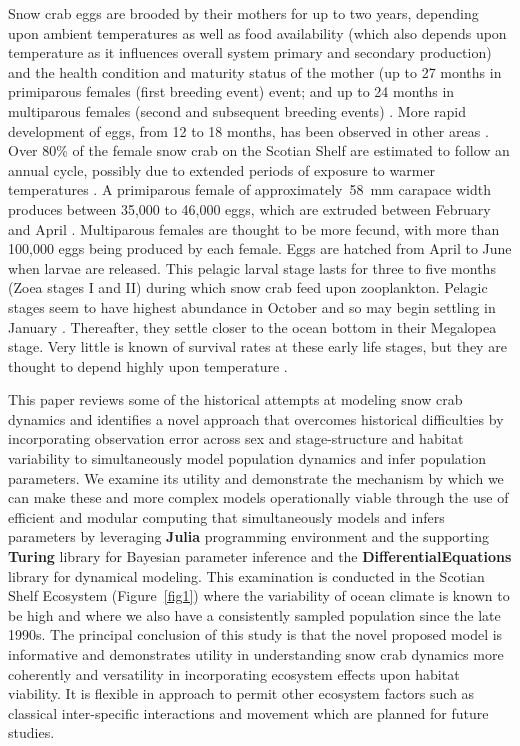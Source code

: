 \documentclass[
	letterpaper, %
	10pt, %
]{article}
\begin{document}
Snow crab eggs are brooded by their mothers for up to two years,
depending upon ambient temperatures as well as food availability (which
also depends upon temperature as it influences overall system primary
and secondary production) and the health condition and maturity status
of the mother (up to 27 months in primiparous females (first breeding event)
event; and up to 24 months in multiparous females (second and subsequent breeding events) \cite{Sainte-Marie_1993}. More rapid development of eggs, from 12
to 18 months, has been observed in other areas \cite{Elner_Beninger_1995, Webb_et_al_2007}. Over 80\% of the female snow crab on the Scotian Shelf are estimated to follow an
annual cycle, possibly due to extended periods of exposure to warmer
temperatures \cite{Kuhn_Choi_2011}. A primiparous female of approximately~58~mm
carapace width produces between 35,000 to 46,000 eggs, which are
extruded between February and April \cite{Sainte-Marie_1993}. Multiparous females are
thought to be more fecund, with more than 100,000 eggs being produced by
each female. Eggs are hatched from April to June when larvae are
released. This pelagic larval stage lasts for three to five months (Zoea
stages I and II) during which snow crab feed upon zooplankton. Pelagic
stages seem to have highest abundance in October and so may begin
settling in January \cite{Kuhn_Choi_2011}. Thereafter, they settle closer to the
ocean bottom in their Megalopea stage. Very little is known of survival rates
at these early life stages, but they are thought to depend highly
upon temperature \cite{Sainte-Marie_Lafrance_2002}. 

This paper reviews some of the historical attempts at modeling snow crab dynamics and identifies a novel approach that overcomes historical difficulties by incorporating observation error across sex and stage-structure and habitat variability to simultaneously model population dynamics and infer population parameters. We examine its utility and demonstrate the mechanism by which we can make these and more complex models operationally viable through the use of efficient and modular computing that simultaneously models and infers parameters by leveraging \textbf{Julia} programming environment \cite{Bezanson_et_al_2017} and
the supporting \textbf{Turing} library \cite{Ge_et_al_2018} for
Bayesian parameter inference and the \textbf{DifferentialEquations} library \cite{Rackauckas_Nie_2017} for dynamical modeling. This examination is conducted in the Scotian Shelf Ecosystem (Figure~\ref{fig1}) where the variability of ocean climate is known to be high \cite{Choi_et_al_2004, Drinkwater_2005} and where we also have a consistently sampled population since the late 1990s. The principal conclusion of this study is that the novel proposed model is informative and demonstrates utility in understanding snow crab dynamics more coherently and versatility in incorporating ecosystem effects upon habitat viability. It is flexible in approach to permit other ecosystem factors such as classical inter-specific interactions and movement which are planned for future studies.
\end{document}
